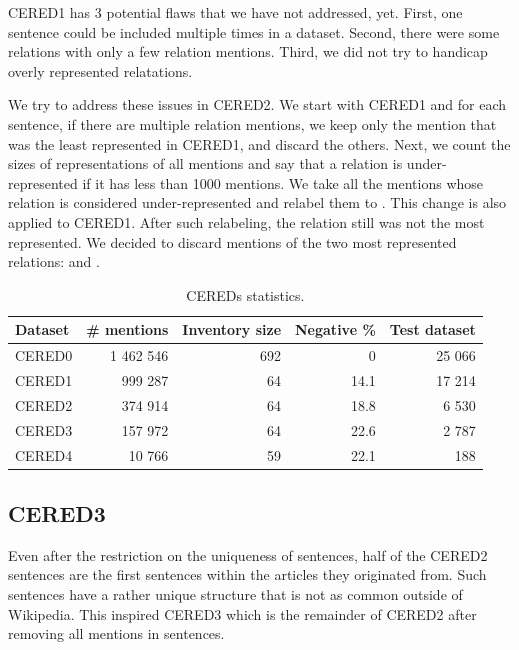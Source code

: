CERED1 has 3 potential flaws that we have not addressed, yet. First, one sentence could be included multiple times in a dataset. Second, there were some relations with only a few relation mentions. Third, we did not try to handicap overly represented relatations. 

We try to address these issues in CERED2. We start with CERED1 and for each sentence, if there are multiple relation mentions, we keep only the mention that was the least represented in CERED1, and discard the others. Next, we count the sizes of representations of all mentions and say that a relation is under-represented if it has less than 1000 mentions. We take all the mentions whose relation is considered under-represented and relabel them to . This change is also applied to CERED1. After such relabeling, the  relation still was not the most represented. We decided to discard mentions of the two most represented relations:  and .

\begin{table}

\caption{CEREDs statistics.}

\label{table01:S10T8}

\begin{tabular}{p{} r r r r }

\hline
Dataset & \# mentions & Inventory size & Negative \% & Test dataset\\
\hline
\hline
CERED0 & 1 462 546 & 692 & 0 & 25 066\\
CERED1 & 999 287 & 64 & 14.1 & 17 214\\
CERED2 & 374 914 & 64 & 18.8 & 6 530\\
CERED3 & 157 972 & 64 & 22.6 & 2 787\\
CERED4 & 10 766 & 59 & 22.1 & 188\\
\hline


\end{tabular}

\end{table}






\subsection{CERED3}
Even after the restriction on the uniqueness of sentences, half of the CERED2 sentences are the first sentences within the articles they originated from. Such sentences have a rather unique structure that is not as common outside of Wikipedia. This inspired CERED3 which is the remainder of CERED2 after removing all mentions in  sentences.

